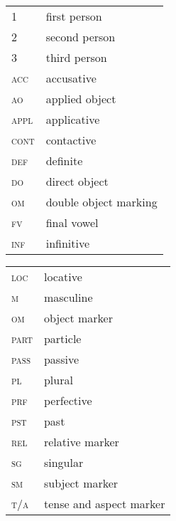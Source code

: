 \documentclass[output=paper]{langsci/langscibook}
\begin{document}
\begin{tabularx}{.45\textwidth}{>{\scshape}lX}
1 & first person \\
2 & second person \\
3 & third person \\
acc & accusative \\
ao & applied object \\
appl & applicative \\
cont & contactive \\
def & definite \\
do & direct object \\
om & double object marking \\
fv & final vowel \\
inf & infinitive \\
\end{tabularx}
\begin{tabularx}{.45\textwidth}{>{\scshape}lX}
loc & locative \\
m & masculine \\
om & object marker \\
part & particle \\
pass & passive \\
pl & plural \\
prf & perfective \\
pst & past \\
rel & relative marker \\
sg & singular \\
sm & subject marker \\
t/a  &  tense and aspect marker \\
\end{tabularx}



\printbibliography[heading=subbibliography,notkeyword=this]
\end{document}
